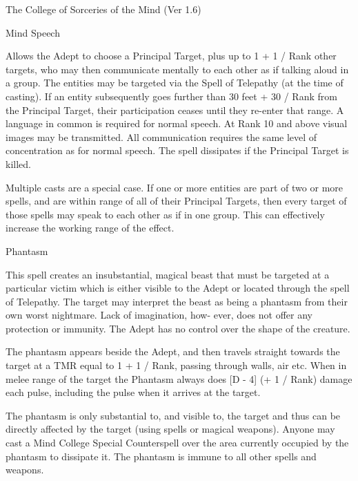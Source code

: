 \begin{Chapter}{The College of Sorceries of the Mind (Ver 1.6)}
\begin{spell}[S-5]{Mind Speech}

\begin{effects}
Allows the Adept to choose a Principal Target, plus up to 1 + 1 / Rank
other targets, who may then communicate mentally to each other as if
talking aloud in a group.  The entities may be targeted via the Spell
of Telepathy (at the time of casting). If an entity subsequently goes
further than 30 feet + 30 / Rank from the Principal Target, their
participation ceases until they re-enter that range.  A language in
common is required for normal speech.  At Rank 10 and above visual
images may be transmitted.  All communication requires the same level
of concentration as for normal speech.  The spell dissipates if the
Principal Target is killed.

Multiple casts are a special case.  If one or more entities are part
of two or more spells, and are within range of all of their Principal
Targets, then every target of those spells may speak to each other as
if in one group. This can effectively increase the working range of
the effect.
\end{effects}
\end{spell}

\begin{spell}[S-6]{Phantasm}

\begin{effects}
This spell creates an insubstantial, magical beast that must be
targeted at a particular victim which is either visible to the Adept
or located through the spell of Telepathy.  The target may interpret
the beast as being a phantasm from their own worst nightmare.  Lack of
imagination, how- ever, does not offer any protection or immunity.
The Adept has no control over the shape of the creature.

The phantasm appears beside the Adept, and then travels straight
towards the target at a TMR equal to 1 + 1 / Rank, passing through
walls, air etc.  When in melee range of the target the Phantasm always
does [D - 4] (+ 1 / Rank) damage each pulse, including the pulse when
it arrives at the target.

The phantasm is only substantial to, and visible to, the target and
thus can be directly affected by the target (using spells or magical
weapons).  Anyone may cast a Mind College Special Counterspell over
the area currently occupied by the phantasm to dissipate it.  The
phantasm is immune to all other spells and weapons.


\end{effects}
\end{spell}
\end{Chapter}
